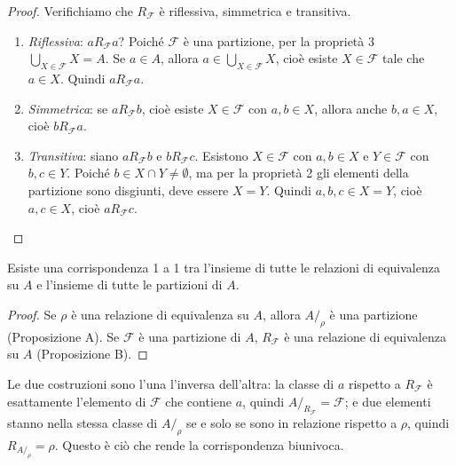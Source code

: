 \documentclass[11pt,a4paper]{article}
\begin{document}
\begin{proof}
Verifichiamo che $R_\mathcal{F}$ è riflessiva, simmetrica e transitiva.
\begin{enumerate}
    \item \emph{Riflessiva}: $a \mathrel{R_\mathcal{F}} a$? Poiché
          $\mathcal{F}$ è una partizione, per la proprietà 3
          $\bigcup_{X \in \mathcal{F}} X = A$. Se $a \in A$, allora
          $a \in \bigcup_{X \in \mathcal{F}} X$, cioè esiste
          $X \in \mathcal{F}$ tale che $a \in X$. Quindi
          $a \mathrel{R_\mathcal{F}} a$.
    \item \emph{Simmetrica}: se $a \mathrel{R_\mathcal{F}} b$, cioè esiste
          $X \in \mathcal{F}$ con $a, b \in X$, allora anche
          $b, a \in X$, cioè $b \mathrel{R_\mathcal{F}} a$.
    \item \emph{Transitiva}: siano $a \mathrel{R_\mathcal{F}} b$ e
          $b \mathrel{R_\mathcal{F}} c$. Esistono $X \in \mathcal{F}$ con
          $a, b \in X$ e $Y \in \mathcal{F}$ con $b, c \in Y$. Poiché
          $b \in X \cap Y \neq \emptyset$, ma per la proprietà 2 gli
          elementi della partizione sono disgiunti, deve essere $X = Y$.
          Quindi $a, b, c \in X = Y$, cioè $a, c \in X$, cioè
          $a \mathrel{R_\mathcal{F}} c$. \qedhere
\end{enumerate}
\end{proof}

\begin{teorema}
Esiste una corrispondenza 1 a 1 tra l'insieme di tutte le relazioni di
equivalenza su $A$ e l'insieme di tutte le partizioni di $A$.
\end{teorema}

\begin{proof}
Se $\rho$ è una relazione di equivalenza su $A$, allora $A/_\rho$ è una
partizione (Proposizione A). Se $\mathcal{F}$ è una partizione di $A$,
$R_\mathcal{F}$ è una relazione di equivalenza su $A$ (Proposizione B).
\end{proof}

\begin{osservazione}
Le due costruzioni sono l'una l'inversa dell'altra: la classe di $a$
rispetto a $R_\mathcal{F}$ è esattamente l'elemento di $\mathcal{F}$ che
contiene $a$, quindi $A/_{R_\mathcal{F}} = \mathcal{F}$; e due elementi
stanno nella stessa classe di $A/_\rho$ se e solo se sono in relazione
rispetto a $\rho$, quindi $R_{A/_\rho} = \rho$. Questo è ciò che rende la
corrispondenza biunivoca.
\end{osservazione}
\end{document}
